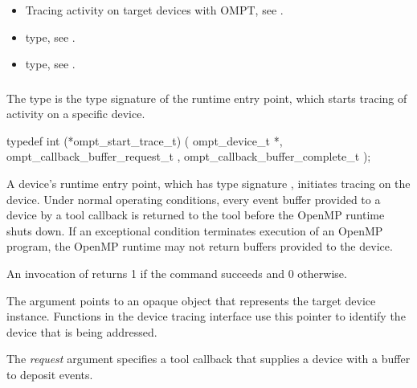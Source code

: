 \crossreferences
\begin{itemize}
\item Tracing activity on target devices with OMPT,
see .

\item {} type, see .

\item {} type, see .
\end{itemize}



\subsubsection{}
\label{sec:ompt_start_trace_t}

\summary
The  type is the type signature of the 
 runtime entry point, which starts tracing 
of activity on a specific device.

\format
\begin{ccppspecific}
\begin{omptInquiry}
typedef int (*ompt_start_trace_t) (
  ompt_device_t *,
  ompt_callback_buffer_request_t ,
  ompt_callback_buffer_complete_t 
);
\end{omptInquiry}
\end{ccppspecific}

\descr
A device's  runtime entry point, which has type
signature , initiates tracing on the device.
Under normal operating conditions, every event buffer provided to a 
device by a tool callback is returned to the tool before the OpenMP 
runtime shuts down. If an exceptional condition terminates  execution 
of an OpenMP program, the OpenMP runtime may not return buffers provided 
to the device.

An invocation of  returns 1 if the command
succeeds and 0 otherwise.

\argdesc
The  argument points to an opaque object that represents
the target device instance. Functions in the device tracing interface
use this pointer to identify the device that is being addressed.

The \emph{request} argument specifies a tool callback that supplies
a device with a buffer to deposit events.

